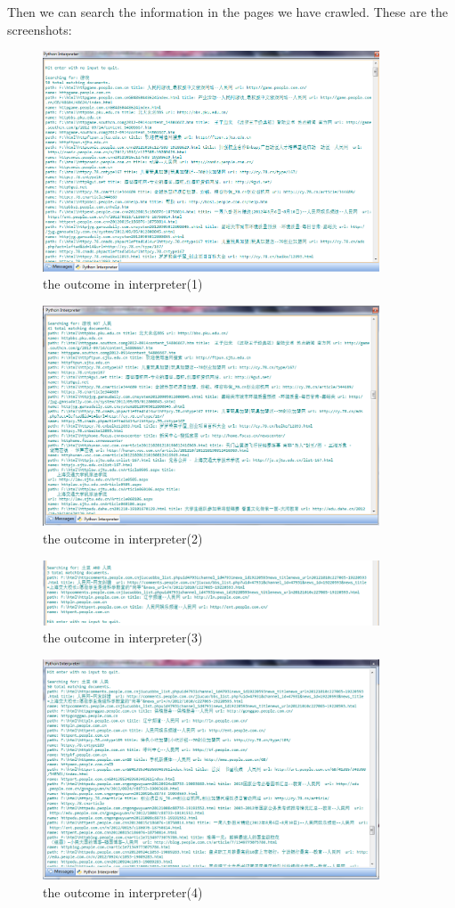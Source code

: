 \documentclass{article}
\begin{document}
Then we can search the information in the pages we have crawled. These are the screenshots:\\
\begin{figure}[htbp]
\centering
\includegraphics[width=10cm]{5.png}
\caption{the outcome in interpreter(1)}
\end{figure}
\begin{figure}[htbp]
\centering
\includegraphics[width=10cm]{6.png}
\caption{the outcome in interpreter(2)}
\end{figure}
\begin{figure}[htbp]
\centering
\includegraphics[width=10cm]{7.png}
\caption{the outcome in interpreter(3)}
\end{figure}
\begin{figure}[htbp]
\centering
\includegraphics[width=10cm]{8.png}
\caption{the outcome in interpreter(4)}
\end{figure}
\end{document}
